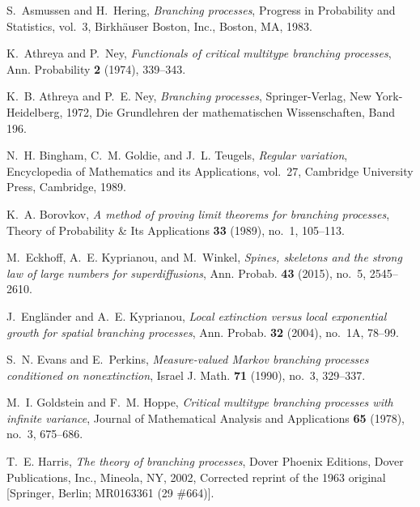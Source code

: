 \documentclass[12pt, a4paper]{amsart}
\theoremstyle{definition}
\numberwithin{equation}{section}
\begin{document}
\begin{thebibliography}{10}
	
	S.~Asmussen and H.~Hering, \emph{Branching processes}, Progress in Probability
	and Statistics, vol.~3, Birkh{\"a}user Boston, Inc., Boston, MA, 1983.
	
	K.~Athreya and P.~Ney, \emph{Functionals of critical multitype branching
		processes}, Ann. Probability \textbf{2} (1974), 339--343. 
	
	K.~B. Athreya and P.~E. Ney, \emph{Branching processes}, Springer-Verlag, New
	York-Heidelberg, 1972, Die Grundlehren der mathematischen Wissenschaften,
	Band 196. 
	
	N.~H. Bingham, C.~M. Goldie, and J.~L. Teugels, \emph{Regular variation},
	Encyclopedia of Mathematics and its Applications, vol.~27, Cambridge
	University Press, Cambridge, 1989. 
	
	K.~A. Borovkov, \emph{A method of proving limit theorems for branching
		processes}, Theory of Probability \& Its Applications \textbf{33} (1989),
	no.~1, 105--113.
	
	M.~Eckhoff, A.~E. Kyprianou, and M.~Winkel, \emph{Spines, skeletons and the
		strong law of large numbers for superdiffusions}, Ann. Probab. \textbf{43}
	(2015), no.~5, 2545--2610. 
	
	J.~Engl{\"a}nder and A.~E. Kyprianou, \emph{Local extinction versus local
		exponential growth for spatial branching processes}, Ann. Probab. \textbf{32}
	(2004), no.~1A, 78--99. 
	
	S.~N. Evans and E.~Perkins, \emph{Measure-valued {M}arkov branching processes
		conditioned on nonextinction}, Israel J. Math. \textbf{71} (1990), no.~3,
	329--337. 
	
	M.~I. Goldstein and F.~M. Hoppe, \emph{Critical multitype branching processes
		with infinite variance}, Journal of Mathematical Analysis and Applications
	\textbf{65} (1978), no.~3, 675--686.
	
	T.~E. Harris, \emph{The theory of branching processes}, Dover Phoenix Editions,
	Dover Publications, Inc., Mineola, NY, 2002, Corrected reprint of the 1963
	original [Springer, Berlin; MR0163361 (29 \#664)]. 
	

\end{thebibliography}
\end{document}
